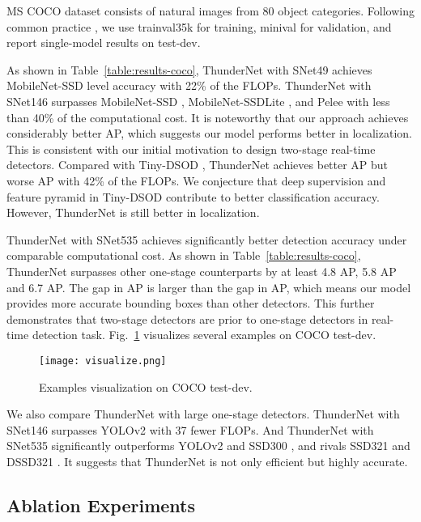 \documentclass[10pt,twocolumn,letterpaper]{article}
\begin{document}
MS COCO dataset consists of natural images from 80 object categories.
Following common practice \cite{lin2017feature,li2017light}, we use trainval35k for training, minival for validation, and report single-model results on test-dev.


As shown in Table~\ref{table:results-coco}, ThunderNet with SNet49 achieves MobileNet-SSD level accuracy with 22\% of the FLOPs.
ThunderNet with SNet146 surpasses MobileNet-SSD \cite{howard2017mobilenets}, MobileNet-SSDLite \cite{sandler2018mobilenetv2}, and Pelee \cite{wang2018pelee} with less than 40\% of the computational cost.
It is noteworthy that our approach achieves considerably better AP, which suggests our model performs better in localization.
This is consistent with our initial motivation to design two-stage real-time detectors.
Compared with Tiny-DSOD \cite{li2018tiny}, ThunderNet achieves better AP but worse AP with 42\% of the FLOPs.
We conjecture that deep supervision and feature pyramid in Tiny-DSOD contribute to better classification accuracy.
However, ThunderNet is still better in localization.


ThunderNet with SNet535 achieves significantly better detection accuracy under comparable computational cost.
As shown in Table~\ref{table:results-coco}, ThunderNet surpasses other one-stage counterparts by at least 4.8 AP, 5.8 AP and 6.7 AP.
The gap in AP is larger than the gap in AP, which means our model provides more accurate bounding boxes than other detectors.
This further demonstrates that two-stage detectors are prior to one-stage detectors in real-time detection task.
Fig.~\ref{figure:coco-visualization} visualizes several examples on COCO test-dev.


\begin{figure}[!t]
\centering
\texttt{[image: visualize.png]}
\caption{Examples visualization on COCO test-dev.}
\label{figure:coco-visualization}
\end{figure}

We also compare ThunderNet with large one-stage detectors.
ThunderNet with SNet146 surpasses YOLOv2 \cite{redmon2017yolo9000} with 37 fewer FLOPs.
And ThunderNet with SNet535 significantly outperforms YOLOv2 and SSD300 \cite{liu2016ssd}, and rivals SSD321 \cite{fu2017dssd} and DSSD321 \cite{fu2017dssd}.
It suggests that ThunderNet is not only efficient but highly accurate.







\subsection{Ablation Experiments}
\end{document}
